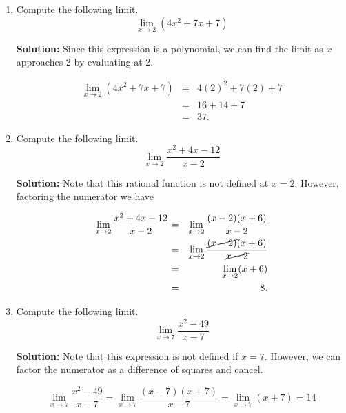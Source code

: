 \documentclass{article}
\begin{document}
\ActivityTitle[class=Calculus I, number=1, name=Limits (Solutions)]

\begin{enumerate}
\item Compute the following limit. \[ \lim_{x \rightarrow 2} \left( 4 x^2 + 7 x + 7 \right) \]

\textbf{Solution:} Since this expression is a polynomial, we can find the limit as $x$ approaches 2 by evaluating at 2.

\begin{eqnarray*}
\lim_{x \rightarrow 2} \left( 4 x^2 + 7 x + 7 \right)
 & = & 4 (2)^2 + 7 (2) + 7 \\
 & = & 16 + 14 + 7 \\
 & = & 37.
\end{eqnarray*}


  
\vspace{1cm}

\item Compute the following limit. \[ \displaystyle\lim_{x \rightarrow 2} \frac{x^2 + 4x - 12}{x - 2} \]

\textbf{Solution:} Note that this rational function is not defined at $x = 2$. However, factoring the numerator we have 

\begin{eqnarray*}
\lim_{x \rightarrow 2} \frac{x^2 + 4x - 12}{x - 2}
 & = & \lim_{x \rightarrow 2} \frac{(x - 2)(x + 6)}{x - 2} \\
 & = & \lim_{x \rightarrow 2} \frac{\cancel{(x - 2)}(x + 6)}{\cancel{x - 2}} \\
 & = & \lim_{x \rightarrow 2} (x + 6) \\
 & = & 8. \\
\end{eqnarray*}


  
\vspace{1cm}

\item Compute the following limit. \[ \lim_{x \rightarrow 7} \frac{x^2 - 49}{x - 7} \]

\textbf{Solution:} Note that this expression is not defined if $x = 7$. However, we can factor the numerator as a difference of squares and cancel.

\[ \lim_{x \rightarrow 7} \frac{x^2 - 49}{x - 7} = \lim_{x \rightarrow 7} \frac{(x - 7)(x + 7)}{x - 7} = \lim_{x \rightarrow 7} (x + 7) = 14 \]



\end{enumerate}
\end{document}
